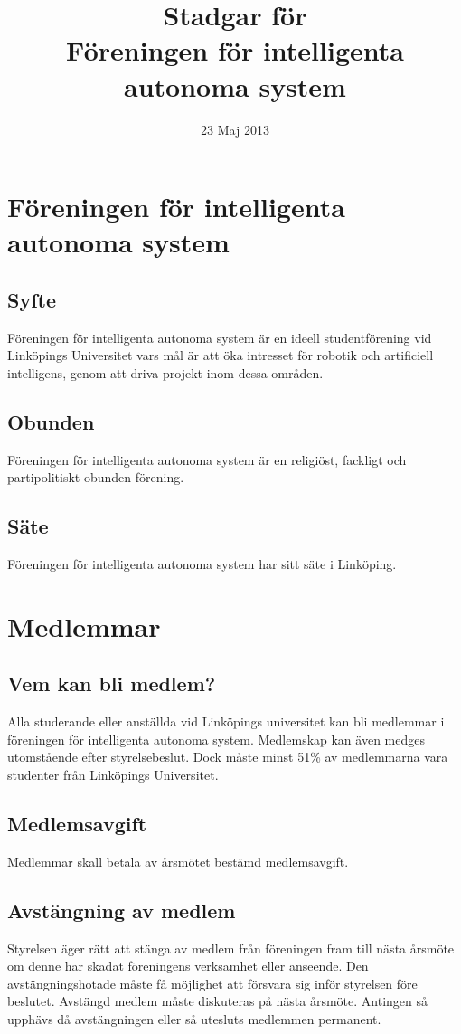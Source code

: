 \documentclass[11pt,a4paper]{article}
\title{Stadgar för\\Föreningen för intelligenta autonoma system}
\date{23 Maj 2013}
\begin{document}
\maketitle

\section{Föreningen för intelligenta autonoma system}

\subsection{Syfte}
Föreningen för intelligenta autonoma system är en ideell studentförening vid Linköpings Universitet vars mål är att öka intresset för robotik och artificiell intelligens, genom att driva projekt inom dessa områden. 
\subsection{Obunden}
Föreningen för intelligenta autonoma system är en religiöst, fackligt och partipolitiskt obunden förening.
\subsection{Säte}
Föreningen för intelligenta autonoma system har sitt säte i Linköping.

\section{Medlemmar}

\subsection{Vem kan bli medlem?}
Alla studerande eller anställda vid Linköpings universitet kan bli medlemmar i föreningen för intelligenta autonoma system.
Medlemskap kan även medges utomstående efter styrelsebeslut. Dock måste minst 51\% av medlemmarna vara studenter från Linköpings Universitet. 
\subsection{Medlemsavgift}
Medlemmar skall betala av årsmötet bestämd medlemsavgift.
\subsection{Avstängning av medlem}
Styrelsen äger rätt att stänga av medlem från föreningen fram till nästa årsmöte om denne har skadat föreningens verksamhet eller anseende. Den avstängningshotade måste få möjlighet att försvara sig inför styrelsen före beslutet. Avstängd medlem måste diskuteras på nästa årsmöte. Antingen så upphävs då avstängningen eller så utesluts medlemmen permanent.
\end{document}
